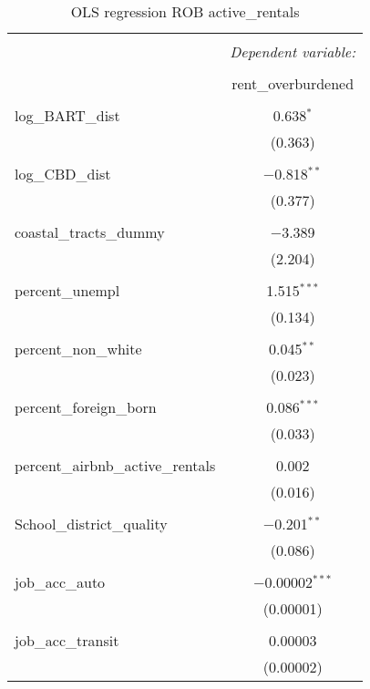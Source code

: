 \documentclass[10pt, letterpaper]{amsart}
\begin{document}
\begin{table}[H] \centering 
  \caption{OLS regression ROB active\_rentals}
  \label{} 
  \begin{tabular}{@{\extracolsep{5pt}}lc} 
    \\[-1.8ex]\hline 
    \hline \\[-1.8ex] 
    & \multicolumn{1}{c}{\textit{Dependent variable:}} \\ 
    \cline{2-2} 
    \\[-1.8ex] & rent\_overburdened \\ 
    \hline \\[-1.8ex] 
    log\_BART\_dist & 0.638$^{*}$ \\ 
    & (0.363) \\ 
    & \\ 
    log\_CBD\_dist & $-$0.818$^{**}$ \\ 
    & (0.377) \\ 
    & \\ 
    coastal\_tracts\_dummy & $-$3.389 \\ 
    & (2.204) \\ 
    & \\ 
    percent\_unempl & 1.515$^{***}$ \\ 
    & (0.134) \\ 
    & \\ 
    percent\_non\_white & 0.045$^{**}$ \\ 
    & (0.023) \\ 
    & \\ 
    percent\_foreign\_born & 0.086$^{***}$ \\ 
    & (0.033) \\ 
    & \\ 
    percent\_airbnb\_active\_rentals & 0.002 \\ 
    & (0.016) \\ 
    & \\ 
    School\_district\_quality & $-$0.201$^{**}$ \\ 
    & (0.086) \\ 
    & \\ 
    job\_acc\_auto & $-$0.00002$^{***}$ \\ 
    & (0.00001) \\ 
    & \\ 
    job\_acc\_transit & 0.00003 \\ 
    & (0.00002) \\ 

\end{tabular}
\end{table}
\end{document}
